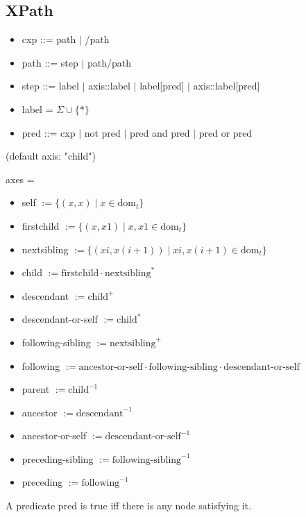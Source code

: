 \documentclass{article}
\begin{document}
\subsection{XPath}
\begin{itemize}
	\item cxp ::= path $|$ /path
	\item path ::= step $|$ path/path
	\item step ::= label $|$ axis::label $|$ label[pred] $|$ axis::label[pred]
	\item label = $\Sigma \cup \{*\}$
	\item pred ::= cxp $|$ not pred $|$ pred and pred $|$ pred or pred
\end{itemize}

(default axis: "child")

axes =
\begin{itemize}
	\item self $:= \{ (x,x) \mid x \in \text{dom}_t\}$
	\item firstchild $:= \{ (x, x1) \mid x, x1 \in \text{dom}_t \}$
	\item nextsibling $:= \{ (xi, x(i+1)) \mid xi, x(i+1) \in \text{dom}_t \}$
	\item child $:= \text{firstchild} \cdot \text{nextsibling}^*$
	\item descendant $:= \text{child}^+$
	\item descendant-or-self $:= \text{child}^*$
	\item following-sibling $:= \text{nextsibling}^+$
	\item following $:= \text{ancestor-or-self} \cdot \text{following-sibling} \cdot \text{descendant-or-self}$
	\item parent $:= \text{child}^{-1}$
	\item ancestor $:= \text{descendant}^{-1}$
	\item ancestor-or-self $:= \text{descendant-or-self}^{-1}$
	\item preceding-sibling $:= \text{following-sibling}^{-1}$
	\item preceding $:= \text{following}^{-1}$
\end{itemize}

A predicate pred is true iff there is any node satisfying it.
\end{document}
